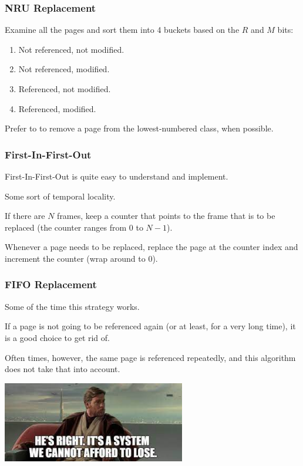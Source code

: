 \begin{frame}
\frametitle{NRU Replacement}

Examine all the pages and sort them into 4 buckets based on the $R$ and $M$ bits:

\begin{enumerate}
	\item Not referenced, not modified.
	\item Not referenced, modified.
	\item Referenced, not modified.
	\item Referenced, modified.
\end{enumerate}

Prefer to to remove a page from the lowest-numbered class, when possible. 

\end{frame}

\begin{frame}
\frametitle{First-In-First-Out}

First-In-First-Out is quite easy to understand and implement. 

Some sort of temporal locality. 

If there are $N$ frames, keep a counter that points to the frame that is to be replaced (the counter ranges from $0$ to $N-1$). 

Whenever a page needs to be replaced, replace the page at the counter index and increment the counter (wrap around to 0).


\end{frame}

\begin{frame}
\frametitle{FIFO Replacement}

Some of the time this strategy works. 

If a page is not going to be referenced again (or at least, for a very long time), it is a good choice to get rid of. 

Often times, however, the same page is referenced repeatedly, and this algorithm does not take that into account. 

\begin{center}
	\includegraphics[width=0.6\textwidth]{images/cannotlose.jpg}
\end{center}

\end{frame}

